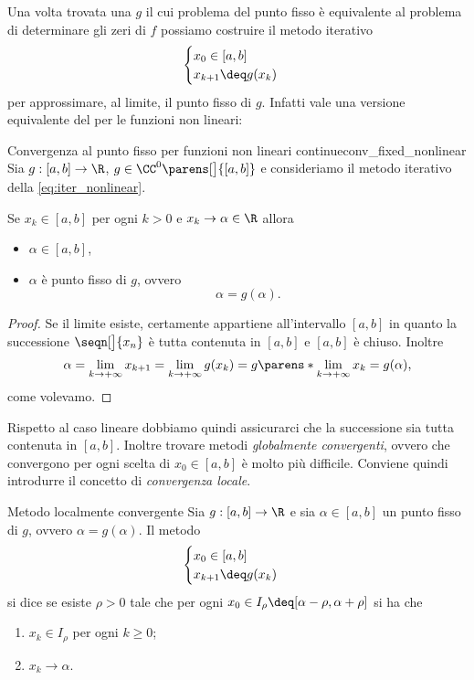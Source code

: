 Una volta trovata una $g$ il cui problema del punto fisso è equivalente al problema di determinare gli zeri di $f$ possiamo costruire il metodo iterativo \begin{equation}\label{eq:iter_nonlinear}
    \begin{cases}
        x_0 \in [a, b]\\
        x_{k+1} \deq g(x_k)
    \end{cases}
\end{equation} per approssimare, al limite, il punto fisso di $g$. 
Infatti vale una versione equivalente del  per le funzioni non lineari:
\begin{theorem}
    {Convergenza al punto fisso per funzioni non lineari continue}{conv_fixed_nonlinear}
    Sia $g : [a, b] \to \R$, $g \in \CC^0\parens[\big]{[a, b]}$ e consideriamo il metodo iterativo della \eqref{eq:iter_nonlinear}. 
    
    Se $x_k \in [a, b]$ per ogni $k > 0$ e $x_k \to \alpha \in \R$ allora \begin{itemize}
        \item $\alpha \in [a, b]$,
        \item $\alpha$ è punto fisso di $g$, ovvero \[
            \alpha = g(\alpha).
        \]
    \end{itemize}
\end{theorem}
\begin{proof}
    Se il limite esiste, certamente appartiene all'intervallo $[a, b]$ in quanto la successione $\seqn[\big]{x_n}$ è tutta contenuta in $[a, b]$ e $[a, b]$ è chiuso. Inoltre \[
        \alpha = \lim_{k \to +\infty} x_{k+1} = \lim_{k \to +\infty} g(x_k) = g\parens*{\lim_{k \to +\infty} x_k} = g(\alpha),
    \] come volevamo.
\end{proof}

Rispetto al caso lineare dobbiamo quindi assicurarci che la successione sia tutta contenuta in $[a, b]$. Inoltre trovare metodi \emph{globalmente convergenti}, ovvero che convergono per ogni scelta di $x_0 \in [a, b]$ è molto più difficile. Conviene quindi introdurre il concetto di \emph{convergenza locale}.

\begin{definition}
    {Metodo localmente convergente}{}
    Sia $g : [a, b] \to \R$ e sia $\alpha \in [a, b]$ un punto fisso di $g$, ovvero $\alpha = g(\alpha)$. Il metodo \[
        \begin{cases}
            x_0 \in [a, b]\\
            x_{k+1} \deq g(x_k)
        \end{cases}
    \] si dice  se esiste $\rho > 0$ tale che per ogni $x_0 \in I_\rho \deq [\alpha - \rho, \alpha + \rho]$ si ha che \begin{enumerate}
        \item $x_k \in I_\rho$ per ogni $k \geq 0$;
        \item $x_k \to \alpha$.  
    \end{enumerate} 
\end{definition} 

